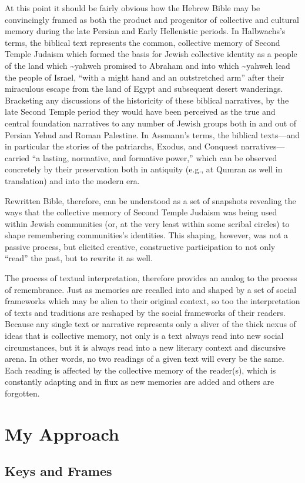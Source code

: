At this point it should be fairly obvious how the Hebrew Bible may be
convincingly framed as both the product and progenitor of collective and
cultural memory during the late Persian and Early Hellenistic periods.
In Halbwachs's terms, the biblical text represents the common,
collective memory of Second Temple Judaism which formed the basis for
Jewish collective identity as a people of the land which
\textasciitilde{}yahweh promised to Abraham and into which
\textasciitilde{}yahweh lead the people of Israel, ``with a might hand
and an outstretched arm'' after their miraculous escape from the land of
Egypt and subsequent desert wanderings. Bracketing any discussions of
the historicity of these biblical narratives, by the late Second Temple
period they would have been perceived as the true and central foundation
narratives to any number of Jewish groups both in and out of Persian
Yehud and Roman Palestine. In Assmann's terms, the biblical texts---and
in particular the stories of the patriarchs, Exodus, and Conquest
narratives---carried ``a lasting, normative, and formative
power,''\autocite[38]{assmann2011} which can be observed concretely by
their preservation both in antiquity (e.g., at Qumran as well in
translation) and into the modern era.

Rewritten Bible, therefore, can be understood as a set of snapshots
revealing the ways that the collective memory of Second Temple Judaism
was being used within Jewish communities (or, at the very least within
some scribal circles) to shape remembering communities's identities.
This shaping, however, was not a passive process, but elicited creative,
constructive participation to not only ``read'' the past, but to rewrite
it as well.

The process of textual interpretation, therefore provides an analog to
the process of remembrance. Just as memories are recalled into and
shaped by a set of social frameworks which may be alien to their
original context, so too the interpretation of texts and traditions are
reshaped by the social frameworks of their readers. Because any single
text or narrative represents only a sliver of the thick nexus of ideas
that is collective memory, not only is a text always read into new
social circumstances, but it is always read into a new literary context
and discursive arena. In other words, no two readings of a given text
will every be the same. Each reading is affected by the collective
memory of the reader(s), which is constantly adapting and in flux as new
memories are added and others are forgotten.

\hypertarget{my-approach}{%
\section{My Approach}\label{my-approach}}

\hypertarget{keys-and-frames}{%
\subsection{Keys and Frames}\label{keys-and-frames}}
